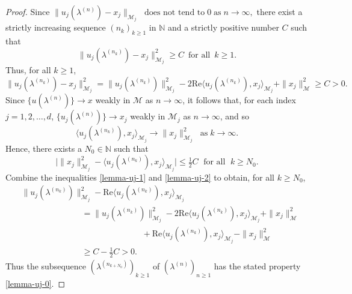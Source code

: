\documentclass[11pt, reqno]{amsart}
\newcommand\1{\boldsymbol {1}}
\newcommand\half{\tfrac 12}
\numberwithin{equation}{section}
\begin{document}
\begin{proof}
Since
$\|u_{j}(\lambda^{(n)}) - x_j\|_{\mathcal{M}_{j}} \; \text{ does not tend to} \; 0 \; \text{as} \; n\rightarrow \infty,$
 there exist a strictly increasing   sequence $(n_k)_{k \geq 1}$ in $\mathbb{N}$ and a strictly positive number $C$ such that 
$$\|u_{j}(\lambda^{(n_k)})- x_j \|_{\mathcal{M}_{j}}^{2}
 \geq C \;\ \text{for all} \; \ k \ge 1.$$ 
Thus, for all $  k \ge 1$,
\begin{equation} \label{lemma-uj-1} 
 \|u_{j}(\lambda^{(n_k)})-x_{j}\|_{\mathcal{M}_{j}}^{2}=\|u_{j}(\lambda^{(n_k)})\|_{\mathcal{M}_{j}}^{2}-2 \mathrm{Re}
 \langle u_{j}(\lambda^{(n_k)}),x_{j}\rangle_{\mathcal{M}_{j}} +\|x_{j}\|_{\mathcal{M}}^{2} \geq C>0.
\end{equation} 
Since $\{u(\lambda^{(n)})\} \to x$  weakly in $\mathcal{M}$ as $n\rightarrow \infty$, it follows that, for each index $j= 1,2, \dots, d$,  $\{u_{j}(\lambda^{(n)})\} \to x_{j}$ weakly in $\mathcal{M}_{j}$ as $n\rightarrow \infty$, and so 
$$\langle u_{j}(\lambda^{(n_k)}),x_{j}\rangle_{\mathcal{M}_{j}} \to \|x_{j}\|_{\mathcal{M}_{j}}^{2}  \; \text { as} \; k \to \infty.
$$
Hence, there exists a $N_0 \in  \mathbb{N}$ such that 
\begin{equation} \label{lemma-uj-2} 
\Big| \|x_{j}\|_{\mathcal{M}_{j}}^{2} - \langle u_{j}(\lambda^{(n_k)}),x_{j}\rangle_{\mathcal{M}_{j}}  \Big| \leq \half C \; \text{ for all } \; k \ge N_0 .
\end{equation} 
Combine the inequalities \eqref{lemma-uj-1} and \eqref{lemma-uj-2} to obtain, for all  $k \ge N_0 $,
\begin{align}\label{lemma-uj-3} 
&\|u_{j}(\lambda^{(n_k)})\|_{\mathcal{M}_{j}}^{2} -\mathrm{Re} \langle u_{j}(\lambda^{(n_k)}),x_{j}\rangle_{\mathcal{M}_{j}}\nonumber\\  
&\hspace{3cm}=\|u_{j}(\lambda^{(n_k)})\|_{\mathcal{M}_{j}}^{2}-2 \mathrm{Re} \langle u_{j}(\lambda^{(n_k)}),x_{j}\rangle_{\mathcal{M}_{j}} +\|x_{j}\|_{\mathcal{M}}^{2} \nonumber\\ 
&\hspace{6cm}+\mathrm{Re} \langle u_{j}(\lambda^{(n_k)}),x_{j}\rangle_{\mathcal{M}_{j}} -\|x_{j}\|_{\mathcal{M}}^{2} \nonumber\\
&\hspace{3cm} \geq C -\half C>0.
\end{align}
Thus the subsequence $(\lambda^{(n_{k + N_0})})_{k \ge 1}$ of $(\lambda^{(n)})_{n \geq 1}$ has the stated property 
\eqref{lemma-uj-0}.
\end{proof}
\end{document}
